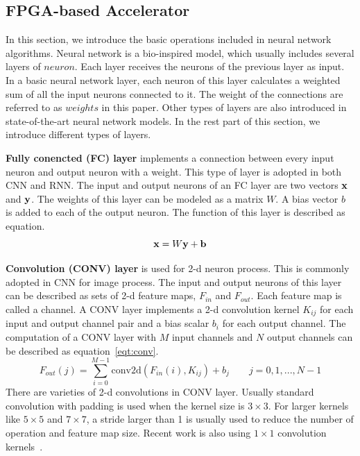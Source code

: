 \subsection{FPGA-based Accelerator}

\rev{}

In this section, we introduce the basic operations included in neural network algorithms. Neural network is a bio-inspired model, which usually includes several layers of $neuron$. Each layer receives the neurons of the previous layer as input. In a basic neural network layer, each neuron of this layer calculates a weighted sum of all the input neurons connected to it. The weight of the connections are referred to as $weights$ in this paper. Other types of layers are also introduced in state-of-the-art neural network models. In the rest part of this section, we introduce different types of layers.

{\bf{Fully conencted (FC) layer}} implements a connection between every input neuron and output neuron with a weight. This type of layer is adopted in both CNN and RNN. The input and output neurons of an FC layer are two vectors $\bf{x}$ and $\bf{y}$. The weights of this layer can be modeled as a matrix $W$. A bias vector $b$ is added to each of the output neuron. The function of this layer is described as equation.
\begin{equation}\label{eqt:fc}
    {\bf{x}} = W{\bf{y}} + {\bf{b}}
\end{equation}

{\bf{Convolution (CONV) layer}} is used for 2-d neuron process. This is commonly adopted in CNN for image process. The input and output neurons of this layer can be described as sets of 2-d feature maps, $F_{in}$ and $F_{out}$. Each feature map is called a channel. A CONV layer implements a 2-d convolution kernel $K_{ij}$ for each input and output channel pair and a bias scalar $b_i$ for each output channel. The computation of a CONV layer with $M$ input channels and $N$ output channels can be described as equation~\ref{eqt:conv}.
\begin{equation}\label{eqt:conv}
    F_{out}(j) = \sum_{i=0}^{M-1} \text{conv2d}(F_{in}(i), K_{ij}) + b_j \qquad j=0,1,...,N-1
\end{equation}
There are varieties of 2-d convolutions in CONV layer. Usually standard convolution with padding is used when the kernel size is $3\times 3$. For larger kernels like $5\times 5$ and $7\times 7$, a stride larger than 1 is usually used to reduce the number of operation and feature map size. Recent work is also using $1\times 1$ convolution kernels~\cite{he2016deep, iandola2016squeezenet}.

